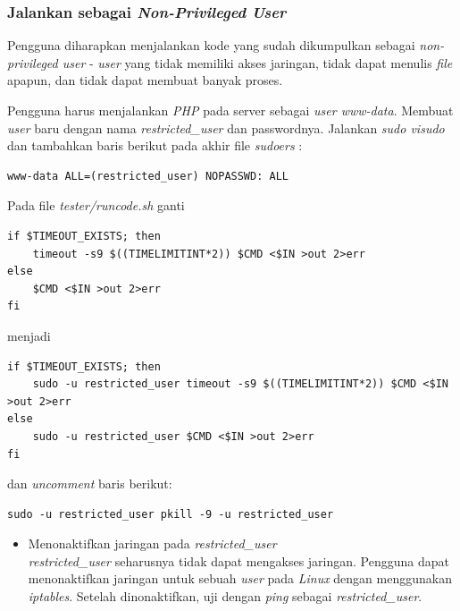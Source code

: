 \documentclass[a4paper,twoside]{article}
\begin{document}
\begin{enumerate}
		\subsubsection*{Jalankan sebagai \textit{Non-Privileged User}}
		\label{subsubsec:non_prileged_user}
		Pengguna diharapkan menjalankan kode yang sudah dikumpulkan sebagai \textit{non-privileged user} - \textit{user} yang tidak memiliki akses jaringan, tidak dapat menulis \textit{file} apapun, dan tidak dapat membuat banyak proses.
		
		Pengguna harus menjalankan \textit{PHP} pada server sebagai \textit{user www-data}. Membuat \textit{user} baru dengan nama \textit{restricted\_user} dan passwordnya. Jalankan \textit{sudo visudo} dan tambahkan baris berikut pada akhir file \textit{sudoers} :
		
		\begin{lstlisting}[basicstyle=\ttfamily, frame=single,
		columns=fullflexible, keepspaces=true, breaklines=true, label=ls:13]
www-data ALL=(restricted_user) NOPASSWD: ALL
		\end{lstlisting}
		
		Pada file \textit{tester/runcode.sh} ganti 
		
		\begin{lstlisting}[basicstyle=\ttfamily, frame=single,
		columns=fullflexible, keepspaces=true, breaklines=true, label=ls:14]
if $TIMEOUT_EXISTS; then
	timeout -s9 $((TIMELIMITINT*2)) $CMD <$IN >out 2>err
else
	$CMD <$IN >out 2>err        
fi
		\end{lstlisting}
		
		menjadi
		
		\begin{lstlisting}[basicstyle=\ttfamily, frame=single,
		columns=fullflexible, keepspaces=true, breaklines=true, label=ls:15]
if $TIMEOUT_EXISTS; then
	sudo -u restricted_user timeout -s9 $((TIMELIMITINT*2)) $CMD <$IN >out 2>err
else
	sudo -u restricted_user $CMD <$IN >out 2>err        
fi
		\end{lstlisting}
		
		dan \textit{uncomment} baris berikut:
		
		\begin{lstlisting}[basicstyle=\ttfamily, frame=single,
		columns=fullflexible, keepspaces=true, breaklines=true, label=ls:16]
sudo -u restricted_user pkill -9 -u restricted_user
		\end{lstlisting}
		
		\begin{itemize}
			\item Menonaktifkan jaringan pada \textit{restricted\_user} \\
			\textit{restricted\_user} seharusnya tidak dapat mengakses jaringan. Pengguna dapat menonaktifkan jaringan untuk sebuah \textit{user} pada \textit{Linux} dengan menggunakan \textit{iptables}. Setelah dinonaktifkan, uji dengan \textit{ping} sebagai \textit{restricted\_user}.
			

\end{itemize}
\end{enumerate}
\end{document}
